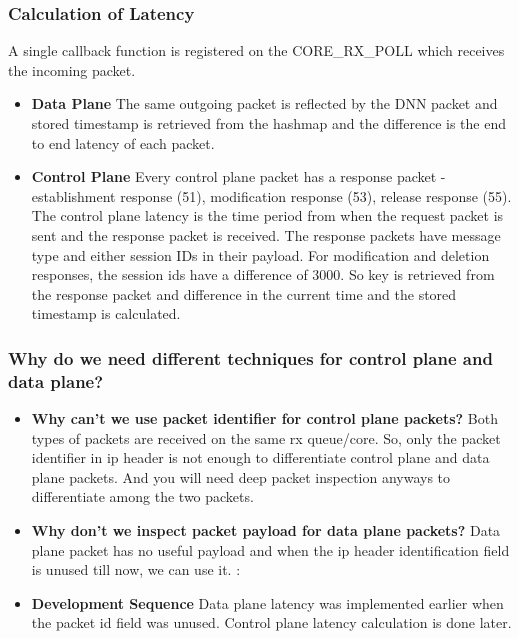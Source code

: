 \documentclass{article}
\begin{document}
 \subsubsection{Calculation of Latency}
 A single callback function is registered on the CORE\_RX\_POLL which  receives the incoming packet. 
 \begin{itemize}
     \item \textbf{Data Plane} The same outgoing packet is reflected by the DNN packet and stored timestamp is retrieved from the hashmap and the difference is the end to end latency of each packet.
     \item \textbf{Control Plane} Every control plane packet has a response packet - establishment response (51), modification response (53), release response (55). The control plane latency is the time period from when the request packet is sent and the response packet is received.
     The response packets have message type and either session IDs in their payload. For modification and deletion  responses, the session ids have a difference of 3000. So key is retrieved from the response packet and difference in the current time and the stored timestamp is calculated.  
 \end{itemize}
 \subsubsection{Why do we need different techniques for control plane and data plane?}
 \begin{itemize}
 \item \textbf{Why can't we use packet identifier for control plane packets?}
    Both types of packets are received on the same rx queue/core. So, only the packet identifier in ip header is not enough to differentiate control plane and data plane packets. And you will need deep packet inspection anyways to differentiate among the two packets.
\item \textbf{Why don't we inspect packet payload for data plane packets?} Data plane packet has no useful payload and when the ip header identification field is unused till now, we can use it.
:\item \textbf{Development Sequence}
Data plane latency was implemented earlier when the packet id field was unused. Control plane latency calculation is done later.
 \end{itemize}

 
\end{document}
